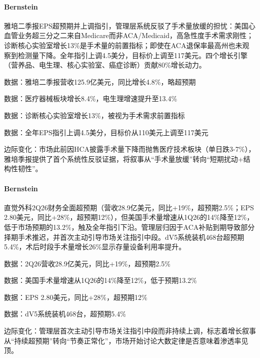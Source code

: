 \documentclass[11pt]{ctexart}
\begin{document}
\paragraph{Bernstein} 雅培二季报EPS超预期并上调指引，管理层系统反驳了手术量放缓的担忧：美国心血管业务超三分之二来自Medicare而非ACA/Medicaid，高急性度手术需求刚性；诊断核心实验室增长13\%是手术量的前置指标；即使在ACA退保率最高州也未观察到检测量下降。全年指引上调4.5美分，目标价上调至117美元。四个增长引擎（营养品、电生理、核心实验室、癌症诊断）贡献80\%增长动力。
{\small\color{refgray}数据：雅培二季报营收125.9亿美元，同比增长4.8\%，略超预期\par}
{\small\color{refgray}数据：医疗器械板块增长8.4\%，电生理增速提升至13.4\%\par}
{\small\color{refgray}数据：诊断核心实验室增长13\%，被视为手术需求前置指标\par}
{\small\color{refgray}数据：全年EPS指引上调4.5美分，目标价从110美元上调至117美元\par}
{\small\color{refgray}边际变化：市场此前因HCA披露手术量下降而抛售医疗技术板块（单日跌3-7\%），雅培季报提供了首个系统性反驳证据，将叙事从“手术量放缓”转向“短期扰动+结构性韧性”。\par}
\paragraph{Bernstein} 直觉外科2Q26财务全面超预期（营收28.9亿美元，同比+19\%，超预期2.5\%；EPS 2.80美元，同比+28\%，超预期12\%），但美国手术量增速从1Q26的14\%降至12\%，低于市场预期的13.2\%，触及全年指引下沿。管理层归因于ACA补贴到期导致部分择期手术推迟，并首次主动引导市场关注指引中段。dV5系统装机468台超预期5.4\%，术后时段手术量增长26\%显示存量设备利用率提升。
{\small\color{refgray}数据：2Q26营收28.9亿美元，同比+19\%，超预期2.5\%\par}
{\small\color{refgray}数据：美国手术量增速从1Q26的14\%降至12\%，低于预期13.2\%\par}
{\small\color{refgray}数据：EPS 2.80美元，同比+28\%，超预期12\%\par}
{\small\color{refgray}数据：dV5系统装机468台，超预期5.4\%\par}
{\small\color{refgray}边际变化：管理层首次主动引导市场关注指引中段而非持续上调，标志着增长叙事从“持续超预期”转向“节奏正常化”，市场开始讨论大数定律是否意味着渗透率见顶。\par}
\end{document}
